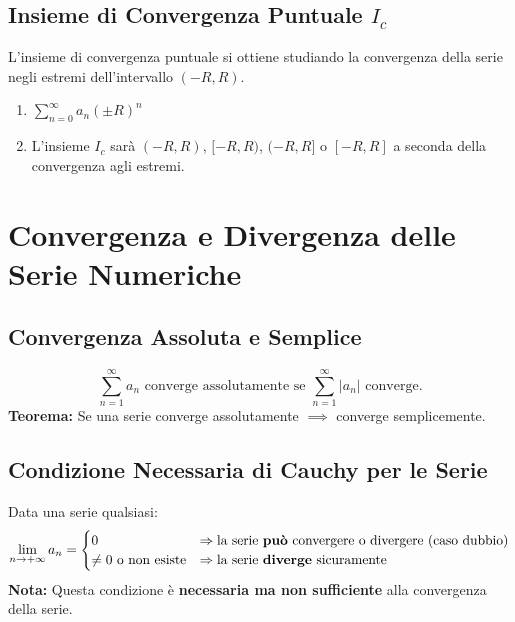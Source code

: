 \documentclass[10pt, a4paper]{article}
\begin{document}
    \subsection{Insieme di Convergenza Puntuale $I_c$}
        L'insieme di convergenza puntuale si ottiene studiando la convergenza della serie negli estremi dell'intervallo $(-R, R)$.
        \begin{enumerate}
            \item $\sum_{n=0}^{\infty}a_n (\pm R)^n$
            \item L'insieme $I_c$ sarà $(-R,R)$, $[-R,R)$, $(-R,R]$ o $[-R,R]$ a seconda della convergenza agli estremi.
        \end{enumerate}
\section{Convergenza e Divergenza delle Serie Numeriche}
    \subsection{Convergenza Assoluta e Semplice}
        \begin{equation*}
            \sum_{n=1}^{\infty}a_n \text{ converge assolutamente se } \sum_{n=1}^{\infty}\left|a_n\right| \text{ converge.}
        \end{equation*}
        \textbf{Teorema:} Se una serie converge assolutamente $\implies$ converge semplicemente.
    \subsection{Condizione Necessaria di Cauchy per le Serie}
        Data una serie qualsiasi:
        \begin{equation*}
            \lim_{n\rightarrow+\infty}a_n = \begin{cases}
                0 & \Rightarrow \text{la serie \textbf{può} convergere o divergere (caso dubbio)} \\
                \neq 0 \text{ o non esiste} & \Rightarrow \text{la serie \textbf{diverge} sicuramente}
            \end{cases}
        \end{equation*}
        \textbf{Nota:} Questa condizione è \textbf{necessaria ma non sufficiente} alla convergenza della serie.
    
    \newpage
\end{document}
